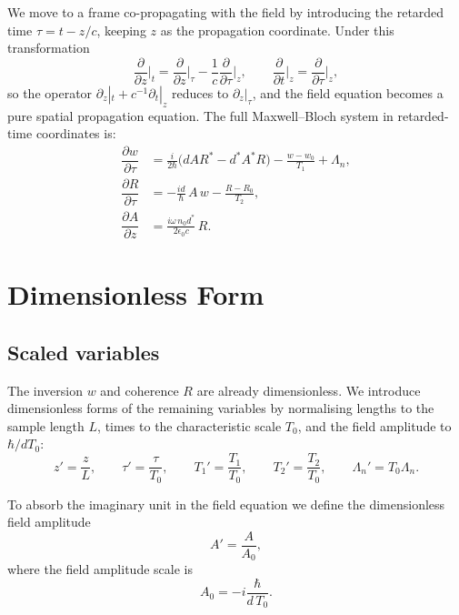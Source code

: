 \documentclass[12pt,a4paper]{article}
\newcommand{\T}{T_0}
\newcommand{\pderiv}[2]{\dfrac{\partial #1}{\partial #2}}
\begin{document}
We move to a frame co-propagating with the field by introducing the retarded
time $\tau = t - z/c$, keeping $z$ as the propagation coordinate.
Under this transformation
\begin{equation}
  \frac{\partial}{\partial z}\bigg|_t
  = \frac{\partial}{\partial z}\bigg|_\tau
  - \frac{1}{c}\frac{\partial}{\partial \tau}\bigg|_z,
  \qquad
  \frac{\partial}{\partial t}\bigg|_z
  = \frac{\partial}{\partial \tau}\bigg|_z,
\end{equation}
so the operator $\partial_z|_t + c^{-1}\partial_t|_z$ reduces to
$\partial_z|_\tau$, and the field equation becomes a pure spatial
propagation equation. The full Maxwell--Bloch system in retarded-time
coordinates is:
\begin{align}
  \pderiv{w}{\tau}
    &= \frac{i}{2\hbar}\bigl(dAR^* - d^*A^*R\bigr)
       - \frac{w - w_0}{T_1}
       + \Lambda_n,
  \label{eq:invRet}\\[4pt]
  \pderiv{R}{\tau}
    &= - \frac{id}{\hbar}\,A\,w - \frac{R-R_0}{T_2},
  \label{eq:cohRet}\\[4pt]
  \pderiv{A}{z}
    &= \frac{i\omega\,n_0 d^*}{2\epsilon_0 c}\,R.
  \label{eq:fieldRet}
\end{align}

\section{Dimensionless Form}

\subsection{Scaled variables}

The inversion $w$ and coherence $R$ are already dimensionless. We introduce
dimensionless forms of the remaining variables by normalising lengths to the
sample length $L$, times to the characteristic scale $\T$, and the field
amplitude to $\hbar/d\T$:
\begin{equation}
  z' = \frac{z}{L}, \qquad \tau' = \frac{\tau}{\T},
  \qquad T_1' = \frac{T_1}{\T}, \qquad T_2' = \frac{T_2}{\T},
  \qquad \Lambda_n' = \T\Lambda_n.
\end{equation}

To absorb the imaginary unit in the field equation we define the
dimensionless field amplitude
\begin{equation}
  A' = \frac{A}{A_0},
  \label{eq:Adef}
\end{equation}
where the field amplitude scale is
\begin{equation}
  A_0 = -i\frac{\hbar}{d\,\T}.
  \label{eq:A0}
\end{equation}
\end{document}
